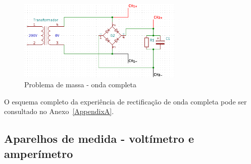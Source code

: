 
\begin{figure}[hbtp]
	\centering
	\includegraphics[width=0.7\textwidth]{figures/sch-ondacompleta-massa.png}
	\caption{Problema de massa - onda completa}
	\label{fig:ondacompleta-massa}
\end{figure}

O esquema completo da experiência de rectificação de onda completa pode ser consultado no Anexo~\ref{AppendixA}.




\subsection{Aparelhos de medida - voltímetro e amperímetro}
\label{sec:aparelhosmedida}

